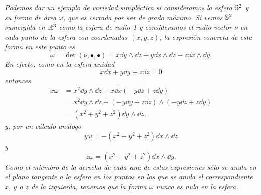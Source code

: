 \begin{ejemplo}
  \em
  Podemos dar un ejemplo de variedad simpléctica si consideramos la esfera $\mathbb{S}^2$ y su forma de área $\omega$, que es cerrada por ser de grado máximo. Si vemos $\mathbb{S}^2$ sumergida en $\mathbb{R}^3$ como la esfera de radio 1 y consideramos el radio vector $\nu$ en cada punto de la esfera con coordenadas $(x,y,z)$, la expresión concreta de esta forma en este punto es
  \begin{equation*}
    \omega=\det(\nu,\bullet,\bullet)=x\dd y \wedge \dd z - y \dd x \wedge \dd z + z \dd x \wedge \dd y.
  \end{equation*}
  En efecto, como en la esfera unidad
  \begin{equation*}
    x\dd x + y \dd y + z \dd z = 0
  \end{equation*}
  entonces
  \begin{align*}
    x\omega &= x^2 \dd y \wedge \dd z +x \dd x (-y \dd z + z \dd y)\\
    & = x^2 \dd y \wedge \dd z + (-y \dd y + z \dd z) \wedge (-y \dd z +z \dd y) \\
    & = (x^2+y^2+z^2)\dd y \wedge \dd z, 
  \end{align*}
  y, por un cálculo análogo
  \begin{equation*}
    y \omega = -(x^2+y^2+z^2) \dd x \wedge \dd z
  \end{equation*}
  y
  \begin{equation*}
    z \omega = (x^2+y^2+z^2) \dd x \wedge \dd y.
  \end{equation*}
  Como el miembro de la derecha de cada una de estas expresiones sólo se anula en el plano tangente a la esfera en los puntos en los que se anula el correspondiente $x$, $y$ o $z$ de la izquierda, tenemos que la forma $\omega$ nunca es nula en la esfera. 


\end{ejemplo}
